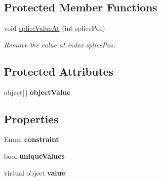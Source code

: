 \subsection*{Protected Member Functions}
\begin{DoxyCompactItemize}
\item 
\hypertarget{classstrange_1_1framework_1_1impl_1_1_semi_binding_a15a785ae9b34142bc49d0d6e8a04209a}{void \hyperlink{classstrange_1_1framework_1_1impl_1_1_semi_binding_a15a785ae9b34142bc49d0d6e8a04209a}{splice\-Value\-At} (int splice\-Pos)}\label{classstrange_1_1framework_1_1impl_1_1_semi_binding_a15a785ae9b34142bc49d0d6e8a04209a}

\begin{DoxyCompactList}\small\item\em Remove the value at index splice\-Pos. \end{DoxyCompactList}\end{DoxyCompactItemize}
\subsection*{Protected Attributes}
\begin{DoxyCompactItemize}
\item 
\hypertarget{classstrange_1_1framework_1_1impl_1_1_semi_binding_a4873e3f49a77ffb32400fb3d7b971b32}{object\mbox{[}$\,$\mbox{]} {\bfseries object\-Value}}\label{classstrange_1_1framework_1_1impl_1_1_semi_binding_a4873e3f49a77ffb32400fb3d7b971b32}

\end{DoxyCompactItemize}
\subsection*{Properties}
\begin{DoxyCompactItemize}
\item 
\hypertarget{classstrange_1_1framework_1_1impl_1_1_semi_binding_a0150494df4cb803713de14cc67383ca9}{Enum {\bfseries constraint}}\label{classstrange_1_1framework_1_1impl_1_1_semi_binding_a0150494df4cb803713de14cc67383ca9}

\item 
\hypertarget{classstrange_1_1framework_1_1impl_1_1_semi_binding_ab5115c4a789d11a90acf7c70e7146c4d}{bool {\bfseries unique\-Values}}\label{classstrange_1_1framework_1_1impl_1_1_semi_binding_ab5115c4a789d11a90acf7c70e7146c4d}

\item 
\hypertarget{classstrange_1_1framework_1_1impl_1_1_semi_binding_aae37109bd7acfcf56ecc95f0172a8b6a}{virtual object {\bfseries value}}\label{classstrange_1_1framework_1_1impl_1_1_semi_binding_aae37109bd7acfcf56ecc95f0172a8b6a}

\end{DoxyCompactItemize}


